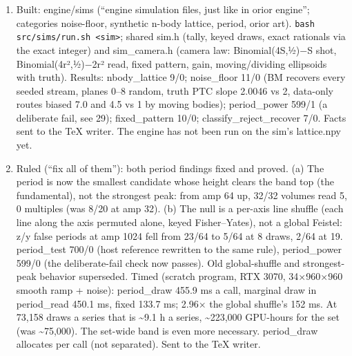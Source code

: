 \begin{enumerate}
\item Built: engine/sims (“engine simulation files, just like in orior engine”; categories noise-floor, synthetic n-body lattice, period, orior art). \texttt{bash src/\allowbreak{}sims/\allowbreak{}run.\allowbreak{}sh <sim>}; shared sim.h (tally, keyed draws, exact rationals via the exact integer) and sim\_\allowbreak{}camera.h (camera law: Binomial(4S,½)−S shot, Binomial(4r²,½)−2r² read, fixed pattern, gain, moving/dividing ellipsoids with truth). Results: nbody\_\allowbreak{}lattice 9/0; noise\_\allowbreak{}floor 11/0 (BM recovers every seeded stream, planes 0–8 random, truth PTC slope 2.0046 vs 2, data-only routes biased 7.0 and 4.5 vs 1 by moving bodies); period\_\allowbreak{}power 599/1 (a deliberate fail, see 29); fixed\_\allowbreak{}pattern 10/0; classify\_\allowbreak{}reject\_\allowbreak{}recover 7/0. Facts sent to the TeX writer. The engine has not been run on the sim's lattice.npy yet.
\item Ruled (“fix all of them”): both period findings fixed and proved. (a) The period is now the smallest candidate whose height clears the band top (the fundamental), not the strongest peak: from amp 64 up, 32/32 volumes read 5, 0 multiples (was 8/20 at amp 32). (b) The null is a per-axis line shuffle (each line along the axis permuted alone, keyed Fisher–Yates), not a global Feistel: z/y false periods at amp 1024 fell from 23/64 to 5/64 at 8 draws, 2/64 at 19. period\_\allowbreak{}test 700/0 (host reference rewritten to the same rule), period\_\allowbreak{}power 599/0 (the deliberate-fail check now passes). Old global-shuffle and strongest-peak behavior superseded. Timed (scratch program, RTX 3070, 34×960×960 smooth ramp + noise): period\_\allowbreak{}draw 455.9 ms a call, marginal draw in period\_\allowbreak{}read 450.1 ms, fixed 133.7 ms; 2.96× the global shuffle's 152 ms. At 73,158 draws a series that is \textasciitilde{}9.1 h a series, \textasciitilde{}223,000 GPU-hours for the set (was \textasciitilde{}75,000). The set-wide band is even more necessary. period\_\allowbreak{}draw allocates per call (not separated). Sent to the TeX writer.

\end{enumerate}

